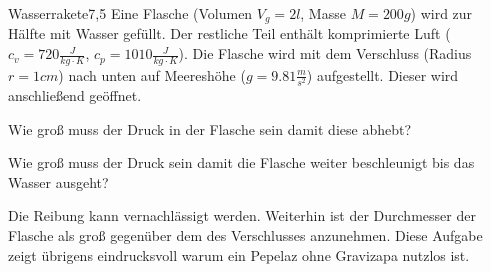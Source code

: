 \begin{problem}{Wasserrakete}{7,5}
Eine Flasche (Volumen $V_g = 2  \unit{l}$, Masse $M = 200 \unit{g}$) wird zur Hälfte mit Wasser gefüllt. Der restliche Teil enthält komprimierte Luft ($c_v=720\unit{\frac{J}{kg \cdot K}}$, $c_p=1010\unit{\frac{J}{kg \cdot K}}$). Die Flasche wird mit dem Verschluss (Radius $r = 1 \unit{cm}$) nach unten auf Meereshöhe ($g=9.81\unit{\frac m{s^2}}$) aufgestellt. Dieser wird anschließend geöffnet.
\begin{abcenum}
\item Wie groß muss der Druck in der Flasche sein damit diese abhebt?
\item Wie groß muss der Druck sein damit die Flasche weiter beschleunigt bis das Wasser ausgeht?
\end{abcenum}
Die Reibung kann vernachlässigt werden. Weiterhin ist der Durchmesser der Flasche als groß gegenüber dem des Verschlusses anzunehmen. Diese Aufgabe zeigt übrigens eindrucksvoll warum ein Pepelaz ohne Gravizapa nutzlos ist.
\end{problem}

